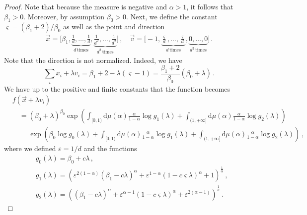 \documentclass[aps,pra,11pt,onecolumn,nofootinbib,tightenlines]{revtex4-2}
\theoremstyle{definition}
\def \d {\mathrm{d}}
\begin{document}
\begin{proof}
Note that because the measure is negative and $\alpha > 1$, it follows that $\beta_1 > 0$. Moreover, by assumption $\beta_0 > 0$.
Next, we define the constant $\varsigma= (\beta_1+2)/\beta_0$ as well as the point and direction
\begin{align}
\vec{x}=\bigg[\beta_1,\underbrace{\frac{1}{d},\ldots,\frac{1}{d}}_{d\,\textrm{times}},\underbrace{\frac{1}{d^2},\ldots,\frac{1}{d^2}}_{d^2\,\textrm{times}}\bigg] \,,
\quad 
\vec{v}=\bigg[-1,\underbrace{\frac{\varsigma}{d},\ldots,\frac{\varsigma}{d}}_{d\,\textrm{times}},\underbrace{0,\ldots,0}_{d^2\,\textrm{times}}\bigg] \,.
\end{align}
Note that the direction is not normalized. Indeed, we have
\begin{equation}
    \sum_i x_i+ \lambda v_i = \beta_1+2-\lambda(\varsigma-1) = \frac{\beta_1+2}{\beta_0}(\beta_0+\lambda) \,.
\end{equation}
We have up to the positive and finite constants
that the function becomes
\begin{align}
    &f(\vec{x} + \lambda v_i)\\
    &\quad= (\beta_0+ \lambda)^{\beta_0}\exp{\left(\int_{[0,1)}\d \mu(\alpha)\frac{\alpha}{1-\alpha}\log{g_1(\lambda)}+\int_{(1,+\infty]}\d \mu(\alpha)\frac{\alpha}{1-\alpha}\log{g_2(\lambda)}\right)}\\
    &\quad=\exp{\left(\beta_0 \log{g_0(\lambda)}+\int_{[0,1)}\d \mu(\alpha)\frac{\alpha}{1-\alpha}\log{g_1(\lambda)}+\int_{(1,+\infty]}\d \mu(\alpha)\frac{\alpha}{1-\alpha}\log{g_2(\lambda)}\right)} \,,
\end{align}
where we defined $\varepsilon=1/d$ and the functions
\begin{align}
    &g_0(\lambda) = \beta_0+c\lambda \,,\\
    & g_1(\lambda) = (\varepsilon^{2(1-\alpha)}(\beta_1-c\lambda)^\alpha+\varepsilon^{1-\alpha}(1-c\varsigma\lambda)^\alpha+1)^\frac{1}{\alpha} \,, \\
    & g_2(\lambda) = ((\beta_1-c\lambda)^\alpha+\varepsilon^{\alpha-1}(1-c\varsigma\lambda)^\alpha+\varepsilon^{2(\alpha-1)})^\frac{1}{\alpha} \,.
\end{align}


\end{proof}
\end{document}
